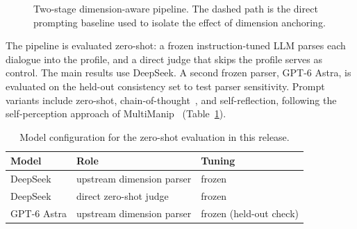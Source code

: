 \documentclass[conference]{IEEEtran}
\begin{document}
\begin{figure}[t]
\centering
{}
\caption{Two-stage dimension-aware pipeline. The dashed path is the direct
prompting baseline used to isolate the effect of dimension anchoring.}
\label{fig:pipeline}
\end{figure}

The pipeline is evaluated zero-shot: a frozen instruction-tuned LLM parses
each dialogue into the profile, and a direct judge that skips the profile
serves as control. The main results use DeepSeek. A second frozen parser,
GPT-6 Astra, is evaluated on the held-out consistency set to test parser
sensitivity. Prompt variants include zero-shot,
chain-of-thought~\cite{wei2022}, and self-reflection, following the
self-perception approach of MultiManip~\cite{multimanip}
(Table~\ref{tab:models}).

\begin{table}[t]
\centering
\caption{Model configuration for the zero-shot evaluation in this release.}
\label{tab:models}
\footnotesize
\begin{tabular}{@{}lll@{}}
\toprule
\textbf{Model} & \textbf{Role} & \textbf{Tuning}\\
\midrule
DeepSeek & upstream dimension parser & frozen\\
DeepSeek & direct zero-shot judge & frozen\\
GPT-6 Astra & upstream dimension parser & frozen (held-out check)\\
\bottomrule
\end{tabular}
\end{table}
\end{document}
